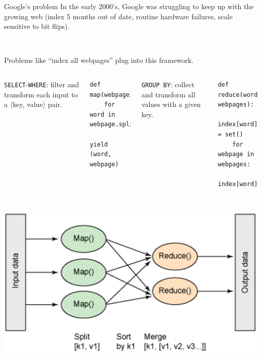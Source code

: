 \documentclass[aspectratio=169]{beamer}
\begin{document}
\begin{frame}{Google's problem}
\large
\vspace{0.45 cm}
In the early 2000's, Google was struggling to keep up with the growing web (index 5 months out of date, routine hardware failures, scale sensitive to bit flips).

\vspace{0.7 cm}

\vspace{0.7 cm}

\vspace{0.7 cm}
\mbox{ } \hfill {} \hfill \mbox{ }

\vspace{0.7 cm}

\end{frame}

\begin{frame}[fragile]{Problems like ``index all webpages'' plug into this framework.}
\vspace{0.5 cm}
\begin{columns}
\texttt{SELECT}-\texttt{WHERE}: filter and transform each input to a $\langle$key, value$\rangle$ pair.

\small
\begin{verbatim}
def map(webpage):
    for word in webpage.split():
        yield (word, webpage)

\end{verbatim}

\texttt{GROUP BY}: collect and transform all values with a given key.

\small
\begin{verbatim}
def reduce(word, webpages):
    index[word] = set()
    for webpage in webpages:
        index[word].add(webpage)
\end{verbatim}
\end{columns}

\vspace{0.25 cm}
\mbox{ } \hfill \includegraphics[width=0.55\linewidth]{mapreduce-diagram-by-ibm.png} \hfill \mbox{ }
\end{frame}
\end{document}
